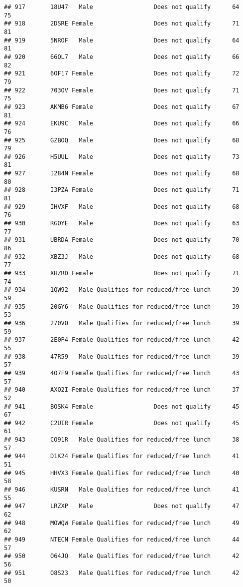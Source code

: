 \documentclass[
]{article}
\begin{document}
\begin{verbatim}
## 917       18U47   Male                 Does not qualify      64       75
## 918       2DSRE Female                 Does not qualify      71       81
## 919       5NROF   Male                 Does not qualify      64       81
## 920       66QL7   Male                 Does not qualify      66       82
## 921       6OF17 Female                 Does not qualify      72       79
## 922       703OV Female                 Does not qualify      71       75
## 923       AKMB6 Female                 Does not qualify      67       81
## 924       EKU9C   Male                 Does not qualify      66       76
## 925       GZBOQ   Male                 Does not qualify      68       79
## 926       H5UUL   Male                 Does not qualify      73       81
## 927       I284N Female                 Does not qualify      68       80
## 928       I3PZA Female                 Does not qualify      71       81
## 929       IHVXF   Male                 Does not qualify      68       76
## 930       RGOYE   Male                 Does not qualify      63       77
## 931       UBRDA Female                 Does not qualify      70       86
## 932       XBZ3J   Male                 Does not qualify      68       77
## 933       XHZRD Female                 Does not qualify      71       74
## 934       1QW92   Male Qualifies for reduced/free lunch      39       59
## 935       20GY6   Male Qualifies for reduced/free lunch      39       53
## 936       270VO   Male Qualifies for reduced/free lunch      39       59
## 937       2E0P4 Female Qualifies for reduced/free lunch      42       55
## 938       47R59   Male Qualifies for reduced/free lunch      39       57
## 939       4O7F9 Female Qualifies for reduced/free lunch      43       57
## 940       AXQ2I Female Qualifies for reduced/free lunch      37       52
## 941       BOSK4 Female                 Does not qualify      45       67
## 942       C2UIR Female                 Does not qualify      45       61
## 943       CO91R   Male Qualifies for reduced/free lunch      38       57
## 944       D1K24 Female Qualifies for reduced/free lunch      41       51
## 945       HHVX3 Female Qualifies for reduced/free lunch      40       58
## 946       KUSRN   Male Qualifies for reduced/free lunch      41       55
## 947       LRZXP   Male                 Does not qualify      47       62
## 948       MOWQW Female Qualifies for reduced/free lunch      49       62
## 949       NTECN Female Qualifies for reduced/free lunch      44       57
## 950       O64JQ   Male Qualifies for reduced/free lunch      42       56
## 951       O8S23   Male Qualifies for reduced/free lunch      42       50

\end{verbatim}
\end{document}

